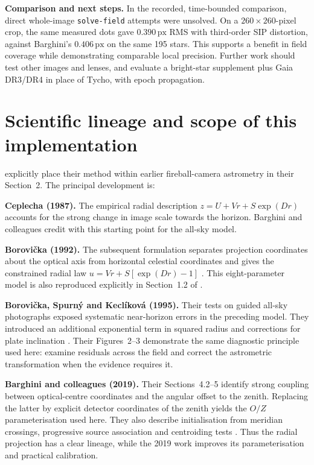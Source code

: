 \documentclass[12pt,a4paper]{article}
\newcommand{\px}{\,\mathrm{px}}
\begin{document}
\textbf{Comparison and next steps.}
In the recorded, time-bounded comparison, direct whole-image
\texttt{solve-field} attempts were unsolved. On a $260\times260$-pixel crop,
the same measured dots gave $0.390\px$ RMS with third-order SIP distortion,
against Barghini's $0.406\px$ on the same 195 stars. This supports a benefit
in field coverage while demonstrating comparable local precision.
Further work should test other images and lenses, and evaluate a bright-star
supplement plus Gaia DR3/DR4 in place of Tycho, with epoch propagation.

\clearpage
\section*{Scientific lineage and scope of this implementation}
\label{sec:lineage}
\citet{barghini2019} explicitly place their method within earlier fireball-camera
astrometry in their Section~2. The principal development is:

\textbf{Ceplecha (1987).}
The empirical radial description $z=U+Vr+S\exp(Dr)$ accounts for the strong
change in image scale towards the horizon. Barghini and colleagues credit
\citet{ceplecha1987} with this starting point for the all-sky model.

\textbf{Borovi\v{c}ka (1992).}
The subsequent formulation separates projection coordinates about the optical
axis from horizontal celestial coordinates and gives the constrained radial
law $u=Vr+S[\exp(Dr)-1]$ \citep{borovicka1992}. This eight-parameter model is
also reproduced explicitly in Section~1.2 of \citet{borovicka1995}.

\textbf{Borovi\v{c}ka, Spurn\'y and Kecl\'ikov\'a (1995).}
Their tests on guided all-sky photographs exposed systematic near-horizon
errors in the preceding model. They introduced an additional exponential
term in squared radius and corrections for plate inclination
\citep{borovicka1995}. Their Figures~2--3 demonstrate the same diagnostic
principle used here: examine residuals across the field and correct the
astrometric transformation when the evidence requires it.

\textbf{Barghini and colleagues (2019).}
Their Sections~4.2--5 identify strong coupling between optical-centre
coordinates and the angular offset to the zenith. Replacing the latter by
explicit detector coordinates of the zenith yields the $O/Z$ parameterisation
used here. They also describe initialisation from meridian crossings,
progressive source association and centroiding tests \citep{barghini2019}.
Thus the radial projection has a clear lineage, while the 2019 work improves
its parameterisation and practical calibration.
\end{document}
